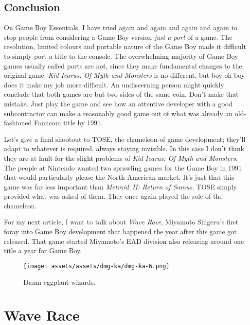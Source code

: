 \documentclass{book}
\begin{document}
\FloatBarrier\needspace{5pt}\section*{Conclusion}\nopagebreak[4]

On Game Boy Essentials, I have tried again and again and again and again to stop people from considering a Game Boy version \emph{just a port} of a game. The resolution, limited colours and portable nature of the Game Boy made it difficult to simply port a title to the console. The overwhelming majority of Game Boy games usually called ports are not, since they make fundamental changes to the original game. \emph{Kid Icarus: Of Myth and Monsters} is no different, but boy oh boy does it make my job more difficult. An undiscerning person might quickly conclude that both games are but two sides of the same coin. Don’t make that mistake. Just play the game and see how an attentive developer with a good subcontractor can make a reasonably good game out of what was already an old-fashioned Famicom title by 1991.

Let’s give a final shootout to TOSE, the chameleon of game development; they’ll adapt to whatever is required, always staying invisible. In this case I don’t think they are at fault for the slight problems of \emph{Kid Icarus: Of Myth and Monsters}. The people at Nintendo wanted two sprawling games for the Game Boy in 1991 that would particularly please the North American market. It’s just that this game was far less important than \emph{Metroid II: Return of Samus}. TOSE simply provided what was asked of them. They once again played the role of the chameleon.

For my next article, I want to talk about \emph{Wave Race}, Miyamoto Shigeru’s first foray into Game Boy development that happened the year after this game got released. That game started Miyamoto’s EAD division also releasing around one title a year for Game Boy.

\begin{figure}[hbt]
\vskip 10pt
\centering \texttt{[image: assets/assets/dmg-ka/dmg-ka-6.png]}\par\pagetwodescription Damn eggplant wizards.
\vskip 6pt
\end{figure}


\begingroup \chapter*{Wave Race} \endgroup
\end{document}
